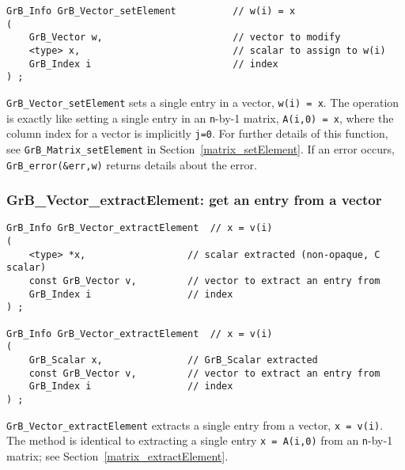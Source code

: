\documentclass[12pt]{article}
\begin{document}
\begin{mdframed}[userdefinedwidth=6in]
{\footnotesize
\begin{verbatim}
GrB_Info GrB_Vector_setElement          // w(i) = x
(
    GrB_Vector w,                       // vector to modify
    <type> x,                           // scalar to assign to w(i)
    GrB_Index i                         // index
) ;
\end{verbatim} } \end{mdframed}

\verb'GrB_Vector_setElement' sets a single entry in a vector, \verb'w(i) = x'.
The operation is exactly like setting a single entry in an \verb'n'-by-1
matrix, \verb'A(i,0) = x', where the column index for a vector is implicitly
\verb'j=0'.  For further details of this function, see
\verb'GrB_Matrix_setElement' in Section~\ref{matrix_setElement}.
If an error occurs, \verb'GrB_error(&err,w)' returns details about the error.

\newpage
\subsubsection{{\sf GrB\_Vector\_extractElement:} get an entry from a vector}
\label{vector_extractElement}

\begin{mdframed}[userdefinedwidth=6in]
{\footnotesize
\begin{verbatim}
GrB_Info GrB_Vector_extractElement  // x = v(i)
(
    <type> *x,                  // scalar extracted (non-opaque, C scalar)
    const GrB_Vector v,         // vector to extract an entry from
    GrB_Index i                 // index
) ;

GrB_Info GrB_Vector_extractElement  // x = v(i)
(
    GrB_Scalar x,               // GrB_Scalar extracted
    const GrB_Vector v,         // vector to extract an entry from
    GrB_Index i                 // index
) ;
\end{verbatim} } \end{mdframed}

\verb'GrB_Vector_extractElement' extracts a single entry from a vector,
\verb'x = v(i)'.  The method is identical to extracting a single entry
\verb'x = A(i,0)' from an \verb'n'-by-1 matrix; see
Section~\ref{matrix_extractElement}.

\end{document}
